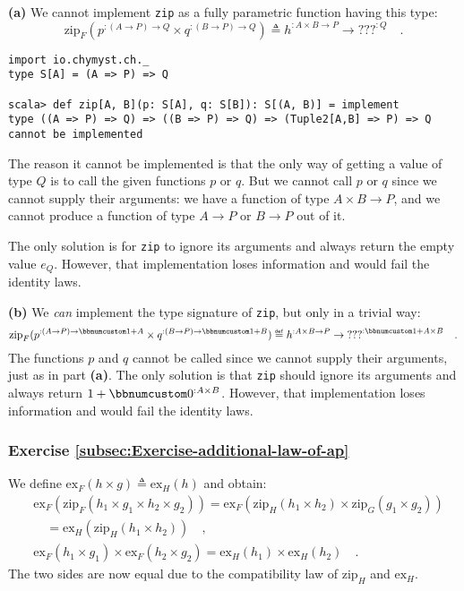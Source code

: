 \textbf{(a)} We cannot implement \lstinline!zip! as a fully parametric
function having this type:
\[
\text{zip}_{F}(p^{:(A\rightarrow P)\rightarrow Q}\times q^{:(B\rightarrow P)\rightarrow Q})\triangleq h^{:A\times B\rightarrow P}\rightarrow\text{???}^{:Q}\quad.
\]
\begin{lstlisting}
import io.chymyst.ch._
type S[A] = (A => P) => Q

scala> def zip[A, B](p: S[A], q: S[B]): S[(A, B)] = implement
type ((A => P) => Q) => ((B => P) => Q) => (Tuple2[A,B] => P) => Q cannot be implemented
\end{lstlisting}

The reason it cannot be implemented is that the only way of getting
a value of type $Q$ is to call the given functions $p$ or $q$.
But we cannot call $p$ or $q$ since we cannot supply their arguments:
we have a function of type $A\times B\rightarrow P$, and we cannot
produce a function of type $A\rightarrow P$ or $B\rightarrow P$
out of it.

The only solution is for \lstinline!zip! to ignore its arguments
and always return the empty value $e_{Q}$. However, that implementation
loses information and would fail the identity laws.

\textbf{(b)} We \emph{can} implement the type signature of \lstinline!zip!,
but only in a trivial way:
\[
\text{zip}_{F}(p^{:(A\rightarrow P)\rightarrow\bbnum 1+A}\times q^{:(B\rightarrow P)\rightarrow\bbnum 1+B})\triangleq h^{:A\times B\rightarrow P}\rightarrow\text{???}^{:\bbnum 1+A\times B}\quad.
\]
The functions $p$ and $q$ cannot be called since we cannot supply
their arguments, just as in part \textbf{(a)}. The only solution is
that \lstinline!zip! should ignore its arguments and always return
$1+\bbnum 0^{:A\times B}$. However, that implementation loses information
and would fail the identity laws.

\subsubsection*{Exercise \ref{subsec:Exercise-additional-law-of-ap}}

We define $\text{ex}_{F}(h\times g)\triangleq\text{ex}_{H}(h)$ and
obtain:
\begin{align*}
 & \text{ex}_{F}(\text{zip}_{F}(h_{1}\times g_{1}\times h_{2}\times g_{2}))=\text{ex}_{F}(\text{zip}_{H}(h_{1}\times h_{2})\times\text{zip}_{G}(g_{1}\times g_{2}))\\
 & \quad=\text{ex}_{H}(\text{zip}_{H}(h_{1}\times h_{2}))\quad,\\
 & \text{ex}_{F}(h_{1}\times g_{1})\times\text{ex}_{F}(h_{2}\times g_{2})=\text{ex}_{H}(h_{1})\times\text{ex}_{H}(h_{2})\quad.
\end{align*}
The two sides are now equal due to the compatibility law of $\text{zip}_{H}$
and $\text{ex}_{H}$.

